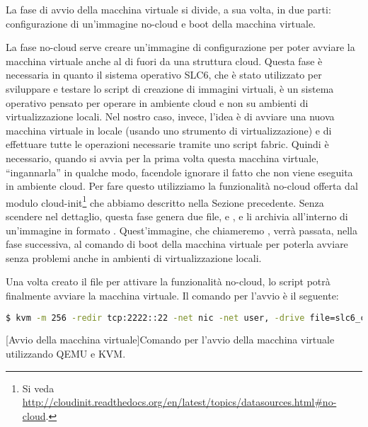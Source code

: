             La fase di avvio della macchina virtuale si divide, a sua volta, in due parti: configurazione di un'immagine  no-cloud e boot della macchina virtuale.
            
            La fase no-cloud serve creare un'immagine  di configurazione per poter avviare la macchina virtuale anche al di fuori da una struttura cloud. Questa fase è necessaria in quanto il sistema operativo \ac{SLC6}, che è stato utilizzato per sviluppare e testare lo script di creazione di immagini virtuali, è un sistema operativo pensato per operare in ambiente cloud e non su ambienti di virtualizzazione locali. Nel nostro caso, invece, l'idea è di avviare una nuova macchina virtuale in locale (usando uno strumento di virtualizzazione) e di effettuare tutte le operazioni necessarie tramite uno script fabric. Quindi è necessario, quando si avvia per la prima volta questa macchina virtuale, ``ingannarla'' in qualche modo, facendole ignorare il fatto che non viene eseguita in ambiente cloud. Per fare questo utilizziamo la funzionalità no-cloud offerta dal modulo cloud-init\footnote{Si veda \url{http://cloudinit.readthedocs.org/en/latest/topics/datasources.html\#no-cloud}.} che abbiamo descritto nella Sezione precedente. Senza scendere nel dettaglio, questa fase genera due file,  e , e li archivia all'interno di un'immagine in formato . Quest'immagine, che chiameremo , verrà passata, nella fase successiva, al comando di boot della macchina virtuale per poterla avviare senza problemi anche in ambienti di virtualizzazione locali.
            
            Una volta creato il file  per attivare la funzionalità no-cloud, lo script potrà finalmente avviare la macchina virtuale. Il comando per l'avvio è il seguente:
            
            \begin{center}
                \begin{minipage}{\linewidth}
                    \begin{lstlisting}[language=bash, gobble=22]
                        $ kvm -m 256 -redir tcp:2222::22 -net nic -net user, -drive file=slc6_cern_x86_64.qcow2,if=virtio -drive file=init.iso,if=virtio -serial file:qemu-output.log &
                    \end{lstlisting}
                    \captionsetup{textformat=empty,labelformat=empty} \vspace{-2em}
                    [Avvio della macchina virtuale]{Comando per l'avvio della macchina virtuale utilizzando \ac{QEMU} e \ac{KVM}.}
                \end{minipage}
            \end{center}
            
